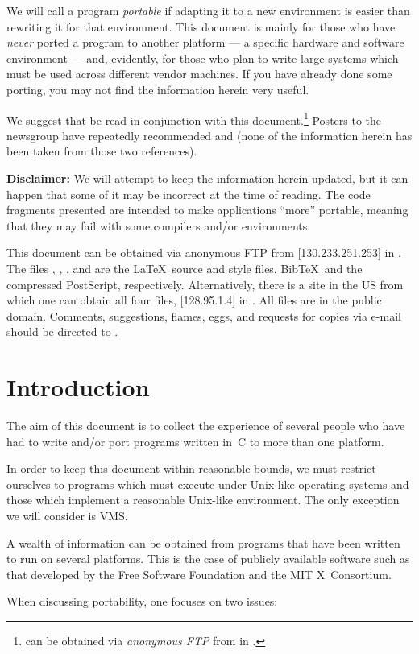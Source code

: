 We will call a program {\em portable\/} if adapting it to a new
environment is easier than rewriting it for that environment.
This document is mainly for those who have {\em never\/} ported
a program to another platform --- a specific hardware and
software environment --- and, evidently, for those who plan to
write large systems which must be used across different vendor
machines.  If you have already done some porting, you may not
find the information herein very useful.

We suggest that \cite{style} be read in conjunction with this
document.\footnote{\cite{style} can be obtained via {\em
anonymous FTP\/} from  in
\@.} Posters to the newsgroup
 have repeatedly recommended \cite{MH} and
\cite{AK} (none of the information herein has been taken from
those two references).

{\bf Disclaimer:} We will attempt to keep the information herein
updated, but it can happen that some of it may be incorrect at
the time of reading. The code fragments presented are intended
to make applications ``more'' portable, meaning that they may
fail with some compilers and/or environments.

{\footnotesize

This document can be obtained via anonymous FTP from
 [130.233.251.253] in
.  The files
, ,
, and  are the \LaTeX\
source and style files, {\sc Bib}\TeX\ and the compressed {\sc PostScript},
respectively. Alternatively, there is a site in the US
from which one can obtain all four
files,  [128.95.1.4] in
\@. All files are in the
public domain. Comments, suggestions, flames, eggs, and requests
for copies via e-mail should be directed to
.
}


\section{Introduction}

The aim of this document is to collect the experience of several
people who have had to write and/or port programs written in~C
to more than one platform.

In order to keep this document within reasonable bounds, we must
restrict ourselves to programs which must execute under
Unix-like operating systems and those which implement a
reasonable Unix-like environment. The only exception we will
consider is VMS\@.

A wealth of information can be obtained from programs that have
been written to run on several platforms. This is the case of
publicly available software such as that developed by the Free
Software Foundation and the MIT X~Consortium.

When discussing portability, one focuses on two issues:

\newcommand{\newblock}{}


